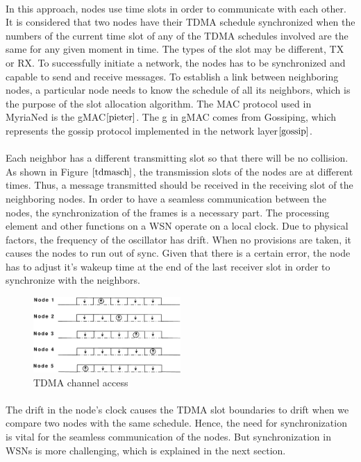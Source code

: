 \documentclass[a4paper,10pt]{report}
\begin{document}
\paragraph*{}
In this approach, nodes use time slots in order to communicate with each other. It is considered that two nodes have
their TDMA schedule synchronized when the numbers of the current time slot of any of the TDMA schedules involved are the same for any
given moment in time. The types of the slot may be different, TX or RX. To successfully initiate a network, the nodes has to be
synchronized and capable to send and receive messages. To establish a link between neighboring nodes, a particular node needs to know
the schedule of all its neighbors, which is the purpose of the slot allocation algorithm. The MAC protocol used in MyriaNed is the gMAC$\cite{pieter}$. The g in gMAC comes from Gossiping, which represents the gossip protocol implemented in the network layer$\cite{gossip}$.
\paragraph*{}
Each neighbor has a different transmitting slot so that there will
be no collision. As shown in Figure $\ref{tdmasch}$, the
transmission slots of the nodes are at different times. Thus, a
message transmitted should be received in the receiving slot of the
neighboring nodes. In order to have a seamless communication between
the nodes, the synchronization of the frames is a necessary part.
The processing element and other functions on a WSN operate on a
local clock. Due to physical factors, the frequency of the
oscillator has drift. When no provisions are taken, it causes the
nodes to run out of sync. Given that there is a certain error, the
node has to adjust it's wakeup time at the end of the last receiver
slot in order to synchronize with the neighbors.
\begin{figure}
\centering
\includegraphics[width=0.5\textwidth]{tdmaschedule}
\caption{TDMA channel access} \label{tdmasch}
\end{figure}
\paragraph*{}
The drift in the node's clock causes the TDMA slot boundaries to drift when we compare two nodes with the same schedule. Hence, the need for synchronization is vital for the seamless communication of the nodes. But synchronization in WSNs is more challenging, which is explained in the next section.
\end{document}
